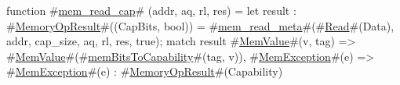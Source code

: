 function #\hyperref[sailRISCVzmemzyreadzycap]{mem\_read\_cap}# (addr, aq, rl, res) = {
  let result : #\hyperref[sailRISCVzMemoryOpResult]{MemoryOpResult}#((CapBits, bool)) = #\hyperref[sailRISCVzmemzyreadzymeta]{mem\_read\_meta}#(#\hyperref[sailRISCVzRead]{Read}#(Data), addr, cap_size, aq, rl, res, true);
  match result {
    #\hyperref[sailRISCVzMemValue]{MemValue}#(v, tag) => #\hyperref[sailRISCVzMemValue]{MemValue}#(#\hyperref[sailRISCVzmemBitsToCapability]{memBitsToCapability}#(tag, v)),
    #\hyperref[sailRISCVzMemException]{MemException}#(e)  => #\hyperref[sailRISCVzMemException]{MemException}#(e) : #\hyperref[sailRISCVzMemoryOpResult]{MemoryOpResult}#(Capability)
  }
}
